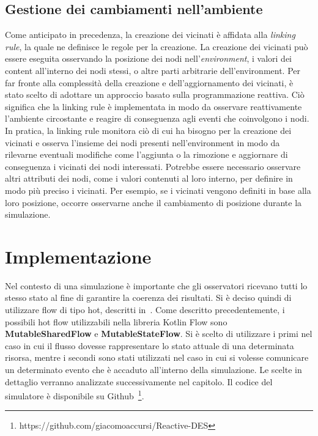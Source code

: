 \documentclass[12pt,a4paper,openright,twoside]{book}
\begin{document}
\subsection{Gestione dei cambiamenti nell'ambiente}
\label{sec:linking-rule}
Come anticipato in precedenza, la creazione dei vicinati è affidata alla \textit{linking rule}, la quale ne definisce le regole per la creazione. La creazione dei vicinati può essere eseguita osservando la posizione dei nodi nell'\textit{environment}, i valori dei content all'interno dei nodi stessi, o altre parti arbitrarie dell'environment. 
Per far fronte alla complessità della creazione e dell'aggiornamento dei vicinati, è stato scelto di adottare un approccio basato sulla programmazione reattiva. Ciò significa che la linking rule è implementata in modo da osservare reattivamente l'ambiente circostante e reagire di conseguenza agli eventi che coinvolgono i nodi.
In pratica, la linking rule monitora ciò di cui ha bisogno per la creazione dei vicinati e osserva l'insieme dei nodi presenti nell'environment in modo da rilevarne eventuali modifiche come l'aggiunta o la rimozione e aggiornare di conseguenza i vicinati dei nodi interessati. Potrebbe essere necessario osservare altri attributi dei nodi, come i valori contenuti al loro interno, per definire in modo più preciso i vicinati.
Per esempio, se i vicinati vengono definiti in base alla loro posizione, occorre osservarne anche il cambiamento di posizione durante la simulazione.

\section{Implementazione}
Nel contesto di una simulazione è importante che gli osservatori ricevano tutti lo stesso stato al fine di garantire la coerenza dei risultati. Si è deciso quindi di utilizzare flow di tipo hot, descritti in~. 
Come descritto precedentemente, i possibili hot flow utilizzabili nella libreria Kotlin Flow sono \textbf{MutableSharedFlow} e \textbf{MutableStateFlow}. Si è scelto di utilizzare i primi nel caso in cui il flusso dovesse rappresentare lo stato attuale di una determinata risorsa, mentre i secondi sono stati utilizzati nel caso in cui si volesse comunicare un determinato evento che è accaduto all'interno della simulazione. Le scelte in dettaglio verranno analizzate successivamente nel capitolo. 
Il codice del simulatore è disponibile su Github~\footnote{https://github.com/giacomoaccursi/Reactive-DES}.
\end{document}
